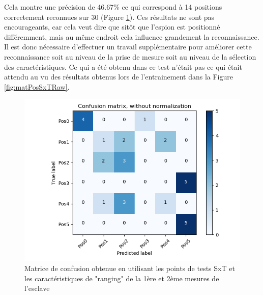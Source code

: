 Cela montre une précision de 46.67\% ce qui correspond à 14 positions correctement reconnues sur 30 (Figure \ref{fig:matPosSxTRawall}). Ces résultats ne sont pas encourageants, car cela veut dire que sitôt que l'espion est positionné différemment, mais au même endroit cela influence grandement la reconnaissance. Il est donc nécessaire d'effectuer un travail supplémentaire pour améliorer cette reconnaissance soit au niveau de la prise de mesure soit au niveau de la sélection des caractéristiques. Ce qui a été obtenu dans ce test n'était pas ce qui était attendu au vu des résultats obtenus lors de l'entrainement dans la Figure \ref{fig:matPosSxTRaw}.
\begin{figure}[htp]
 \begin{center}
  \includegraphics[scale=0.5]{figures/mat_pos_SxT_rawall.png}
  \caption{Matrice de confusion obtenue en utilisant les points de tests SxT et les caractéristiques de "ranging" de la 1ère et 2ème mesures de l'esclave}
  \label{fig:matPosSxTRawall} %
 \end{center}
\end{figure}

